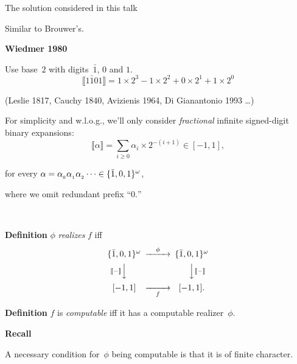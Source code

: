 \documentclass{csslides-1.1}
\newcommand{\sscript}[1]{_{\empty_{#1}}}
\newcommand{\myemph}[1]{{\it #1}\/}
\begin{document}
\begin{slide}{The solution considered in this talk}

Similar to Brouwer's.

\vfill

{\bf Wiedmer 1980}

Use base~$2$ with digits~$\bar{1}$, $0$ and $1$.
\[
\llbracket 1\bar{1}01 \rrbracket 
= 1 \times 2^{3}
- 1 \times 2^{2}
+ 0 \times 2^{1}
+ 1 \times 2^{0}
\]
\cdot
\rrbracket

(Leslie 1817, Cauchy 1840, Avizienis 1964, Di Gianantonio 1993 \dots)
\vfill

For simplicity and w.l.o.g., we'll only consider \emph{fractional}
infinite signed-digit binary expansions:
\[
\llbracket \alpha \rrbracket
=\sum_{i \ge 0} \alpha_i \times 2^{-(i+1)} \in [-1,1],
\]

for every $\alpha=\alpha\sscript{0}
\alpha\sscript{1} \alpha\sscript{2} \cdots \in \{\bar{1},0,1\}^{\omega}$,

where we omit redundant prefix ``$0.$'' 

\vfill


\end{slide}

\begin{slide}{}

~

\vfill

{\bf Definition} $\phi$ \myemph{realizes} $f$ iff
\[
\begin{CD}
\{\bar{1},0,1\}^{\omega}  @>{\phi}>>  \{\bar{1},0,1\}^{\omega} \\
@V{\llbracket - \rrbracket}VV @VV{\llbracket - \rrbracket}V \\
[-1,1] @>>{f}> [-1,1].
\end{CD} 
\]

\vfill

{\bf Definition} $f$ is \myemph{computable} iff it has a computable
realizer~$\phi$.

\vfill

{\bf Recall}

A necessary condition for~$\phi$ being computable is that it is of
finite character.

\vfill

\end{slide}
\end{document}
